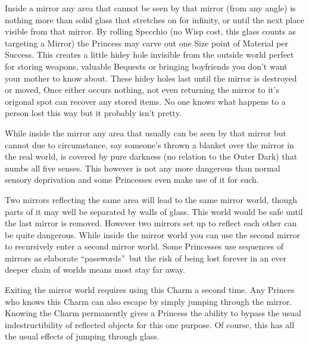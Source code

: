 Inside a mirror any area that cannot be seen by that mirror (from any angle) is nothing more than solid glass that stretches on for infinity, or until the next place visible from that mirror. By rolling Specchio (no Wisp cost, this glass counts as targeting a Mirror) the Princess may carve out one Size point of Material per Success. This creates a little hidey hole invisible from the outside world perfect for storing weapons, valuable Bequests or bringing boyfriends you don't want your mother to know about. These hidey holes last until the mirror is destroyed or moved, Once either occurs nothing, not even returning the mirror to it's origonal spot can recover any stored items. No one knows what happens to a person lost this way but it probably isn't pretty.

While inside the mirror any area that usually can be seen by that mirror but cannot due to circumstance, say someone's thrown a blanket over the mirror in the real world, is covered by pure darkness (no relation to the Outer Dark) that numbs all five senses. This however is not any more dangerous than normal sensory deprivation and some Princesses even make use of it for such.

Two mirrors reflecting the same area will lead to the same mirror world, though parts of it may well be separated by walls of glass. This world would be safe until the last mirror is removed. However two mirrors set up to reflect each other can be quite dangerous. While inside the mirror world you can use the second mirror to recursively enter a second mirror world. Some Princesses use sequences of mirrors as elaborate \textquotedblleft passwords\textquotedblright\, but the risk of being lost forever in an ever deeper chain of worlds means most stay far away.

Exiting the mirror world requires using this Charm a second time. Any Princes who knows this Charm can also escape by simply jumping through the mirror. Knowing the Charm permanently gives a Princess the ability to bypass the usual indestructibility of reflected objects for this one purpose. Of course, this has all the usual effects of jumping through glass. 


